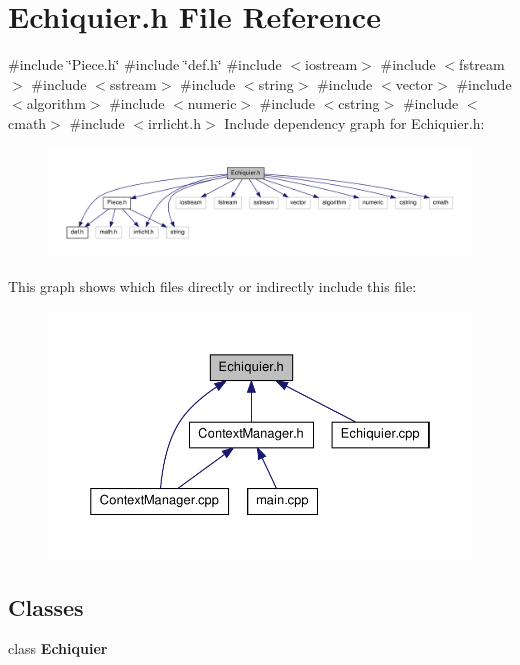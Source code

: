 \section{\-Echiquier.\-h \-File \-Reference}
\label{_echiquier_8h}
{\ttfamily \#include \char`\"{}\-Piece.\-h\char`\"{}}\*
{\ttfamily \#include \char`\"{}def.\-h\char`\"{}}\*
{\ttfamily \#include $<$iostream$>$}\*
{\ttfamily \#include $<$fstream$>$}\*
{\ttfamily \#include $<$sstream$>$}\*
{\ttfamily \#include $<$string$>$}\*
{\ttfamily \#include $<$vector$>$}\*
{\ttfamily \#include $<$algorithm$>$}\*
{\ttfamily \#include $<$numeric$>$}\*
{\ttfamily \#include $<$cstring$>$}\*
{\ttfamily \#include $<$cmath$>$}\*
{\ttfamily \#include $<$irrlicht.\-h$>$}\*
\-Include dependency graph for \-Echiquier.\-h\-:
\nopagebreak
\begin{figure}[H]
\begin{center}
\leavevmode
\includegraphics[width=350pt]{_echiquier_8h__incl}
\end{center}
\end{figure}
\-This graph shows which files directly or indirectly include this file\-:
\nopagebreak
\begin{figure}[H]
\begin{center}
\leavevmode
\includegraphics[width=350pt]{_echiquier_8h__dep__incl}
\end{center}
\end{figure}
\subsection*{\-Classes}
\begin{DoxyCompactItemize}
\item 
class {\bf \-Echiquier}
\end{DoxyCompactItemize}
